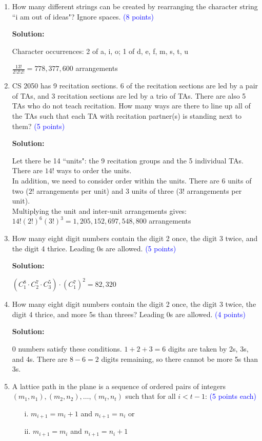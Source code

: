 \documentclass{article}
\newcommand{\pt}[1]{\textcolor{blue}{(#1 points)}}
\newcommand{\pte}[1]{\textcolor{blue}{(#1 points each)}}
\newenvironment{solution}
{
\par
\color{blue}
\textbf{Solution:}
}
{
\par
}
\begin{document}
\begin{enumerate}
\item How many different strings can be created by rearranging the character string ``i am out of ideas"? Ignore spaces. \pt{8}
\begin{solution}
Character occurrences: 2 of a, i, o; 1 of d, e, f, m, s, t, u

$\frac{13!}{2!2!2!} = 778,377,600$ arrangements
\end{solution}

\item CS 2050 has 9 recitation sections. 6 of the recitation sections are led by a pair of TAs, and 3 recitation sections are led by a trio of TAs. There are also 5 TAs who do not teach recitation. How many ways are there to line up all of the TAs such that each TA with recitation partner(s) is standing next to them? \pt{5}
\begin{solution}
Let there be 14 ``units": the 9 recitation groups and the 5 individual TAs. There are $14!$ ways to order the units.\\
In addition, we need to consider order within the units. There are 6 units of two ($2!$ arrangements per unit) and 3 units of three ($3!$ arrangements per unit).\\ Multiplying the unit and inter-unit arrangements gives: $14! (2!)^6 (3!)^3 = 1,205,152,697,548,800$ arrangements
\end{solution}

\item How many eight digit numbers contain the digit 2 once, the digit 3 twice, and the digit 4 thrice. Leading 0s are allowed. \pt{5}
\begin{solution}
$(C^8_1 \cdot C^7_2 \cdot C^5_3) \cdot (C^7_1)^2= 82,320$
\end{solution}

\item How many eight digit numbers contain the digit 2 once, the digit 3 twice, the digit 4 thrice, and more 5s than threes? Leading 0s are allowed. \pt{4}
\begin{solution}
0 numbers satisfy these conditions. $1 + 2 + 3 = 6$ digits are taken by 2s, 3s, and 4s. There are $8 - 6 = 2$ digits remaining, so there cannot be more 5s than 3s.
\end{solution}

\item A lattice path in the plane is a sequence of ordered pairs of integers $(m_1,n_1),(m_2,n_2),\dots,(m_t,n_t)$ such that for all $i < t-1$: \pte{5}
\begin{enumerate}
    \item[i.] $m_{i+1}=m_i+1$ and $n_{i+1} = n_i$ or
    \item[ii.] $m_{i+1}=m_i$ and $n_{i+1}=n_i+1$
\end{enumerate}


\end{enumerate}
\end{document}
